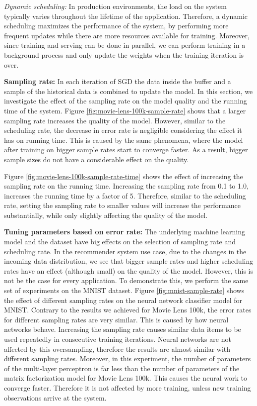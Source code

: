 \documentclass{vldb}
\begin{document}
\textit{Dynamic scheduling:} In production environments, the load on the system typically varies throughout the lifetime of the application.
Therefore, a dynamic scheduling maximizes the performance of the system, by performing more frequent updates while there are more resources available for training. 
Moreover, since training and serving can be done in parallel, we can perform training in a background process and only update the weights when the training iteration is over. 

\textbf{Sampling rate:} In each iteration of SGD the data inside the buffer and a sample of the historical data is combined to update the model.
In this section, we investigate the effect of the sampling rate on the model quality and the running time of the system.
Figure \ref{fig:movie-lens-100k-sample-rate} shows that a larger sampling rate increases the quality of the model.
However, similar to the scheduling rate, the decrease in error rate is negligible considering the effect it has on running time. 
This is caused by the same phenomena, where the model after training on bigger sample rates start to converge faster.
As a result, bigger sample sizes do not have a considerable effect on the quality.
 
Figure \ref{fig:movie-lens-100k-sample-rate-time} shows the effect of increasing the sampling rate on the running time.
Increasing the sampling rate from 0.1 to 1.0, increases the running time by a factor of 5.
Therefore, similar to the scheduling rate, setting the sampling rate to smaller values will increase the performance substantially, while only slightly affecting the quality of the model.

\textbf{Tuning parameters based on error rate:} The underlying machine learning model and the dataset have big effects on the selection of sampling rate and scheduling rate.
In the recommender system use case, due to the changes in the incoming data distribution, we see that bigger sample rates and higher scheduling rates have an effect (although small) on the quality of the model.
However, this is not be the case for every application.
To demonstrate this, we perform the same set of experiments on the MNIST dataset.
Figure \ref{fig:mnist-sample-rate} shows the effect of different sampling rates on the neural network classifier model for MNIST.
Contrary to the results we achieved for Movie Lens 100k, the error rates for different sampling rates are very similar.
This is caused by how neural networks behave.
Increasing the sampling rate causes similar data items to be used repeatedly in consecutive training iterations.
Neural networks are not affected by this oversampling, therefore the results are almost similar with different sampling rates.
Moreover, in this experiment, the number of parameters of the multi-layer perceptron is far less than the number of parameters of the matrix factorization model for Movie Lens 100k.
This causes the neural work to converge faster.
Therefore it is not affected by more training, unless new training observations arrive at the system.
\end{document}
